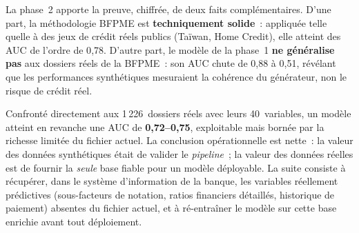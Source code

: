 \documentclass[a4paper,11pt]{report}
\begin{document}
La phase~2 apporte la preuve, chiffrée, de deux faits complémentaires. D'une part, la
méthodologie BFPME est \textbf{techniquement solide}~: appliquée telle quelle à des jeux de
crédit réels publics (Taïwan, Home Credit), elle atteint des AUC de l'ordre de 0{,}78. D'autre
part, le modèle de la phase~1 \textbf{ne généralise pas} aux dossiers réels de la BFPME~: son
AUC chute de 0{,}88 à 0{,}51, révélant que les performances synthétiques mesuraient la cohérence
du générateur, non le risque de crédit réel.

Confronté directement aux 1\,226~dossiers réels avec leurs 40~variables, un modèle atteint en
revanche une AUC de \textbf{0{,}72–0{,}75}, exploitable mais bornée par la richesse limitée du
fichier actuel. La conclusion opérationnelle est nette~: la valeur des données synthétiques était
de valider le \emph{pipeline}~; la valeur des données réelles est de fournir la \emph{seule} base
fiable pour un modèle déployable. La suite consiste à récupérer, dans le système d'information de
la banque, les variables réellement prédictives (sous-facteurs de notation, ratios financiers
détaillés, historique de paiement) absentes du fichier actuel, et à ré-entraîner le modèle sur
cette base enrichie avant tout déploiement.
\end{document}
